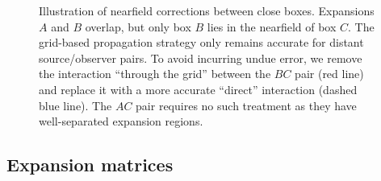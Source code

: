 \begin{figure}
  \centering
  \caption{\label{fig:nearfield correction}Illustration of nearfield corrections between close boxes.
    Expansions $A$ and $B$ overlap, but only box $B$ lies in the nearfield of box $C$.
    The grid-based propagation strategy only remains accurate for distant source/observer pairs.
    To avoid incurring undue error, we remove the interaction ``through the grid'' between the $BC$ pair (red line) and replace it with a more accurate ``direct'' interaction (dashed blue line).
    The $AC$ pair requires no such treatment as they have well-separated expansion regions.
  }
\end{figure}

\subsection{\label{sec:expansion matrices}Expansion matrices}

